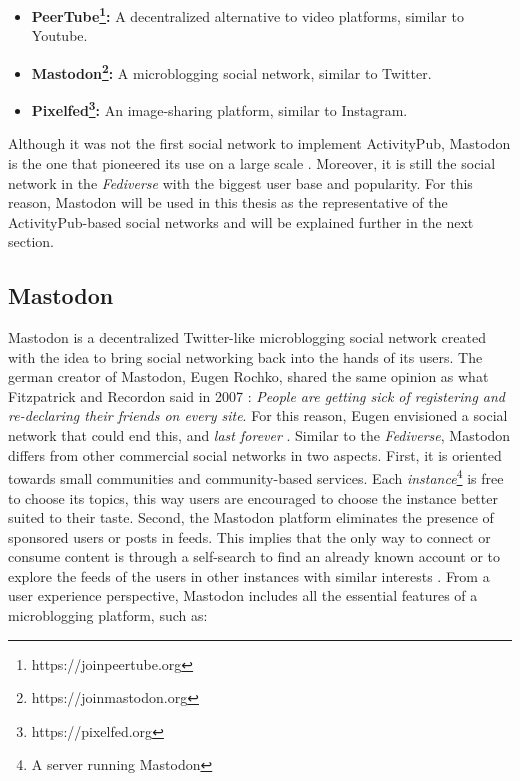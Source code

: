 \begin{itemize}
  \item \textbf{PeerTube\footnote{https://joinpeertube.org}:} A decentralized alternative to video platforms, similar to Youtube.
  \item \textbf{Mastodon\footnote{https://joinmastodon.org}:} A microblogging social network, similar to Twitter. 
  \item \textbf{Pixelfed\footnote{https://pixelfed.org}:} An image-sharing platform, similar to Instagram. 
\end{itemize} 

Although it was not the first social network to implement ActivityPub, Mastodon is the one that pioneered its use on a large scale \cite{lemmer-webber_2017}. Moreover, it is still the social network in the \emph{Fediverse} with the biggest user base and popularity. For this reason, Mastodon will be used in this thesis as the representative of the ActivityPub-based social networks and will be explained further in the next section. 

\subsection{Mastodon}\label{subsec:mastodon}

 Mastodon is a decentralized Twitter-like microblogging social network created with the idea to bring social networking back into the hands of its users. The german creator of Mastodon, Eugen Rochko, shared the same opinion as what Fitzpatrick and Recordon said in 2007 \cite{fitzpatrick_recordon_2007}: \emph{People are getting sick of registering and re-declaring their friends on every site}. For this reason, Eugen envisioned a social network that could end this, and \emph{last forever} \cite{tilley_2018}. Similar to the \emph{Fediverse}, Mastodon differs from other commercial social networks in two aspects. First, it is oriented towards small communities and community-based services. Each \emph{instance}\footnote{A server running Mastodon} is free to choose its topics, this way users are encouraged to choose the instance better suited to their taste. Second, the Mastodon platform eliminates the presence of sponsored users or posts in feeds. This implies that the only way to connect or consume content is through a self-search to find an already known account or to explore the feeds of the users in other instances with similar interests \cite{8845221}. From a user experience perspective, Mastodon includes all the essential features of a microblogging platform, such as:


